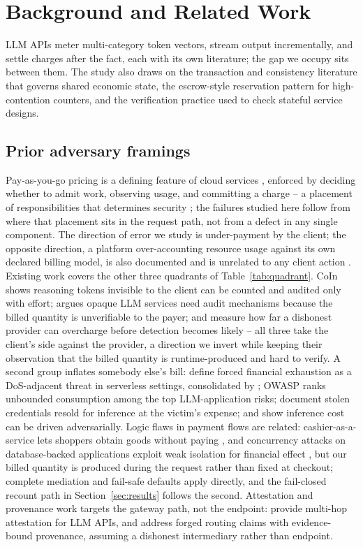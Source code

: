 \documentclass[manuscript,review]{acmart}
\begin{document}
\section{Background and Related Work}
\label{sec:related}
LLM APIs meter multi-category token vectors, stream output incrementally, and settle
charges after the fact, each with its own literature; the gap we occupy sits between
them. The study also draws on the transaction and consistency literature that governs
shared economic state, the escrow-style reservation pattern for high-contention counters,
and the verification practice used to check stateful service designs.

\subsection{Prior adversary framings}
Pay-as-you-go pricing is a defining feature of cloud services \citep{armbrust}, enforced
by deciding whether to admit work, observing usage, and committing a charge -- a
placement of responsibilities that determines security \citep{bass}; the failures studied
here follow from where that placement sits in the request path, not from a defect in any
single component. The direction of error we study is under-payment by the client; the
opposite direction, a platform over-accounting resource usage against its own declared
billing model, is also documented and is unrelated to any client action
\citep{serverlesscosts}. Existing work covers the other three quadrants of
Table~\ref{tab:quadrant}. CoIn \citep{coin} shows reasoning tokens invisible to the client
can be counted and audited only with effort; \citet{invisible} argues opaque LLM services
need audit mechanisms because the billed quantity is unverifiable to the payer; and
\citet{tokeninflation} measure how far a dishonest provider can overcharge before
detection becomes likely -- all three take the client's side against the provider, a
direction we invert while keeping their observation that the billed quantity is
runtime-produced and hard to verify. A second group inflates somebody else's bill: \citet{dow} define forced financial
exhaustion as a DoS-adjacent threat in serverless settings, consolidated by
\citet{dowreview}; OWASP \citep{owasp} ranks unbounded consumption among the top
LLM-application risks; \citet{llmjacking} document stolen credentials resold for
inference at the victim's expense; and \citet{sponge} show inference cost can be driven
adversarially. Logic flaws in payment flows are related: cashier-as-a-service lets
shoppers obtain goods without paying \citep{cashier}, and concurrency attacks on
database-backed applications exploit weak isolation for financial effect
\citep{acidrain}, but our billed quantity is produced during the request rather than
fixed at checkout; complete mediation and fail-safe defaults \citep{saltzer} apply
directly, and the fail-closed recount path in Section~\ref{sec:results} follows the
second. Attestation and provenance work targets the gateway path, not the endpoint: \citet{aex}
provide multi-hop attestation for LLM APIs, and \citet{gwprov} address forged routing
claims with evidence-bound provenance, assuming a dishonest intermediary rather than
endpoint.
\end{document}
